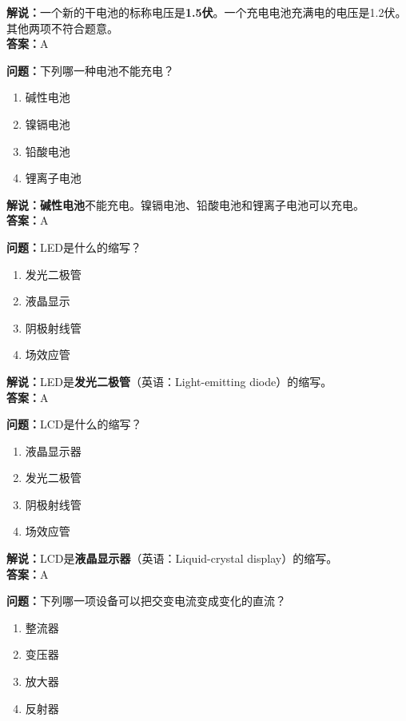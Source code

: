 \textbf{解说：}一个新的干电池的标称电压是\textbf{1.5伏}。一个充电电池充满电的电压是1.2伏。其他两项不符合题意。\\\textbf{答案：}A%


\textbf{问题：}下列哪一种电池不能充电？

\begin{enumerate}[label=\Alph*), leftmargin=1.5cm]
	\item 碱性电池
	\item 镍镉电池
	\item 铅酸电池
	\item 锂离子电池
\end{enumerate}

\textbf{解说：碱性电池}不能充电。镍镉电池、铅酸电池和锂离子电池可以充电。\\\textbf{答案：}A

\textbf{问题：}LED是什么的缩写？

\begin{enumerate}[label=\Alph*), leftmargin=1.5cm]
	\item 发光二极管
	\item 液晶显示
	\item 阴极射线管
	\item 场效应管
\end{enumerate}

\textbf{解说：}LED是\textbf{发光二极管}（英语：Light-emitting diode）的缩写。\\\textbf{答案：}A%


\textbf{问题：}LCD是什么的缩写？

\begin{enumerate}[label=\Alph*), leftmargin=1.5cm]
	\item 液晶显示器
	\item 发光二极管
	\item 阴极射线管
	\item 场效应管
\end{enumerate}

\textbf{解说：}LCD是\textbf{液晶显示器}（英语：Liquid-crystal display）的缩写。\\\textbf{答案：}A%


\textbf{问题：}下列哪一项设备可以把交变电流变成变化的直流？

\begin{enumerate}[label=\Alph*), leftmargin=1.5cm]
	\item 整流器
	\item 变压器
	\item 放大器
	\item 反射器
\end{enumerate}

